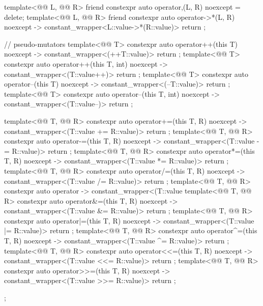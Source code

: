 \begin{codeblock}
{{    template<@@ L, @@ R>
      friend constexpr auto operator,(L, R) noexcept = delete;
    template<@@ L, @@ R>
      friend constexpr auto operator->*(L, R) noexcept -> constant_wrapper<L::value->*(R::value)>
        { return {}; }

    // pseudo-mutators
    template<@@ T>
      constexpr auto operator++(this T) noexcept
        -> constant_wrapper<(++T::value)> { return {}; }
    template<@@ T>
      constexpr auto operator++(this T, int) noexcept
        -> constant_wrapper<(T::value++)> { return {}; }
    template<@@ T>
      constexpr auto operator--(this T) noexcept
        -> constant_wrapper<(--T::value)> { return {}; }
    template<@@ T>
      constexpr auto operator--(this T, int) noexcept
        -> constant_wrapper<(T::value--)> { return {}; }

    template<@@ T, @@ R>
      constexpr auto operator+=(this T, R) noexcept
        -> constant_wrapper<(T::value += R::value)> { return {}; }
    template<@@ T, @@ R>
      constexpr auto operator-=(this T, R) noexcept
        -> constant_wrapper<(T::value -= R::value)> { return {}; }
    template<@@ T, @@ R>
      constexpr auto operator*=(this T, R) noexcept
        -> constant_wrapper<(T::value *= R::value)> { return {}; }
    template<@@ T, @@ R>
      constexpr auto operator/=(this T, R) noexcept
        -> constant_wrapper<(T::value /= R::value)> { return {}; }
    template<@@ T, @@ R>
      constexpr auto operator%
        -> constant_wrapper<(T::value %
    template<@@ T, @@ R>
      constexpr auto operator&=(this T, R) noexcept
        -> constant_wrapper<(T::value &= R::value)> { return {}; }
    template<@@ T, @@ R>
      constexpr auto operator|=(this T, R) noexcept
        -> constant_wrapper<(T::value |= R::value)> { return {}; }
    template<@@ T, @@ R>
      constexpr auto operator^=(this T, R) noexcept
        -> constant_wrapper<(T::value ^= R::value)> { return {}; }
    template<@@ T, @@ R>
      constexpr auto operator<<=(this T, R) noexcept
        -> constant_wrapper<(T::value <<= R::value)> { return {}; }
    template<@@ T, @@ R>
      constexpr auto operator>>=(this T, R) noexcept
        -> constant_wrapper<(T::value >>= R::value)> { return {}; }
  };

}
\end{codeblock}
